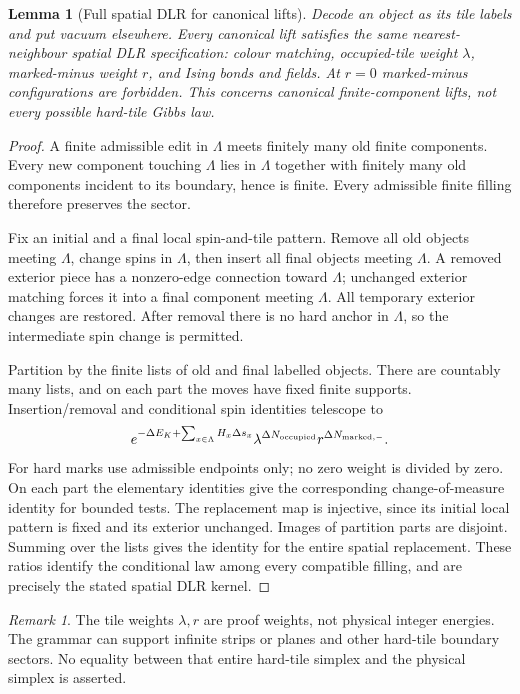 \documentclass[11pt,reqno]{amsart}
\numberwithin{equation}{section}
\newtheorem{lemma}[theorem]{Lemma}
\theoremstyle{definition}
\theoremstyle{remark}
\newtheorem{remark}[theorem]{Remark}
\begin{document}
\begin{lemma}[Full spatial DLR for canonical lifts]\label{lem:spatialDLR}
Decode an object as its tile labels and put vacuum elsewhere. Every canonical lift satisfies the same nearest-neighbour spatial DLR specification: colour matching, occupied-tile weight $\lambda$, marked-minus weight $r$, and Ising bonds and fields. At $r=0$ marked-minus configurations are forbidden. This concerns canonical finite-component lifts, not every possible hard-tile Gibbs law.
\end{lemma}
\begin{proof}
A finite admissible edit in $\Lambda$ meets finitely many old finite components. Every new component touching $\Lambda$ lies in $\Lambda$ together with finitely many old components incident to its boundary, hence is finite. Every admissible finite filling therefore preserves the sector.

Fix an initial and a final local spin-and-tile pattern. Remove all old objects meeting $\Lambda$, change spins in $\Lambda$, then insert all final objects meeting $\Lambda$. A removed exterior piece has a nonzero-edge connection toward $\Lambda$; unchanged exterior matching forces it into a final component meeting $\Lambda$. All temporary exterior changes are restored. After removal there is no hard anchor in $\Lambda$, so the intermediate spin change is permitted.

Partition by the finite lists of old and final labelled objects. There are countably many lists, and on each part the moves have fixed finite supports. Insertion/removal and conditional spin identities telescope to
\begin{equation}\label{eq:spatialratio}
 e^{-\Delta E_K+\sum_{x\in\Lambda}H_x\Delta s_x}
 \lambda^{\Delta N_{\rm occupied}}r^{\Delta N_{\rm marked,-}}.
\end{equation}
For hard marks use admissible endpoints only; no zero weight is divided by zero. On each part the elementary identities give the corresponding change-of-measure identity for bounded tests. The replacement map is injective, since its initial local pattern is fixed and its exterior unchanged. Images of partition parts are disjoint. Summing over the lists gives the identity for the entire spatial replacement. These ratios identify the conditional law among every compatible filling, and are precisely the stated spatial DLR kernel.
\end{proof}

\begin{remark}
The tile weights $\lambda,r$ are proof weights, not physical integer energies. The grammar can support infinite strips or planes and other hard-tile boundary sectors. No equality between that entire hard-tile simplex and the physical simplex is asserted.
\end{remark}
\end{document}
